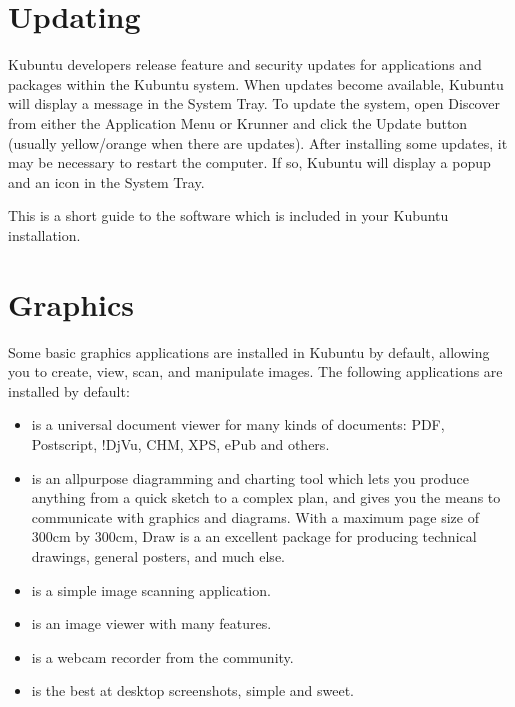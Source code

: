 \documentclass[letterpaper,10pt,english]{sphinxmanual}
\begin{document}
\section{Updating}
\label{\detokenize{docs/software:updating}}
\sphinxAtStartPar
Kubuntu developers release feature and security updates for applications and packages within the Kubuntu system. When updates become available, Kubuntu will display a message in the System Tray. To update the system, open Discover from either the Application Menu or Krunner and click the Update button (usually yellow/orange when there are updates). After installing some updates, it may be necessary to restart the computer. If so, Kubuntu will display a pop\sphinxhyphen{}up and an icon in the System Tray.

\noindent{}

\sphinxAtStartPar
This is a short guide to the software which is included in your Kubuntu installation.


\section{Graphics}
\label{\detokenize{docs/software:graphics}}
\sphinxAtStartPar
Some basic graphics applications are installed in Kubuntu by default, allowing you to create, view, scan, and manipulate images. The following applications are installed by default:
\begin{itemize}
\item {} 
\sphinxAtStartPar
{} is a universal document viewer for many kinds of documents: PDF, Postscript, !DjVu, CHM, XPS, ePub and others.

\item {} 
\sphinxAtStartPar
{} is an all\sphinxhyphen{}purpose diagramming and charting tool which lets you produce anything from a quick sketch to a complex plan, and gives you the means to communicate with graphics and diagrams. With a maximum page size of 300cm by 300cm, Draw is a an excellent package for producing technical drawings, general posters, and much else.

\item {} 
\sphinxAtStartPar
{} is a simple image scanning application.

\item {} 
\sphinxAtStartPar
{} is an image viewer with many features.

\item {} 
\sphinxAtStartPar
{} is a webcam recorder from the  community.

\item {} 
\sphinxAtStartPar
{} is the best at desktop screenshots, simple and sweet.

\end{itemize}
\end{document}
